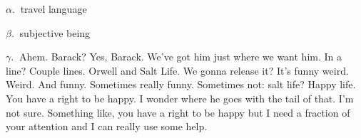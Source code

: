 

$\alpha.\ $ travel language

$\beta.\ $ subjective being

$\gamma.\ $ Ahem.  Barack?  Yes, Barack.  We've got him just where we want him.  In a line?  Couple lines.  Orwell and Salt Life.  We gonna release it?  It's funny weird.  Weird.  And funny.  Sometimes really funny.  Sometimes not: salt life?  Happy life.  You have a right to be happy.  I wonder where he goes with the tail of that.  I'm not sure.  Something like, you have a right to be happy but I need a fraction of your attention and I can really use some help.

\bye
